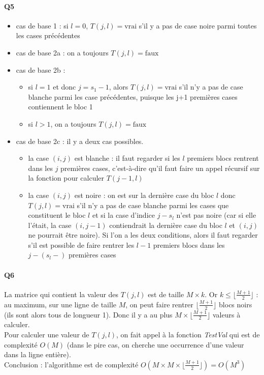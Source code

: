\documentclass[12pt]{article}
\newcommand{\true}{\text{vrai}}
\newcommand{\false}{\text{faux}}
\begin{document}
	\paragraph{Q5}
	
	\begin{itemize}
		\item cas de base 1 : si $ l=0 $, $ T(j,l) = \true $ s'il y a pas de case noire parmi toutes les cases précédentes
		
		\item cas de base 2a : on a toujours $ T(j,l) = \false $
		
		\item cas de base 2b : \begin{itemize}
			\item si $ l=1 $ et donc $ j = s_1-1$, alors $ T(j,l) = \true $ s'il n'y a pas de case blanche parmi les case précédentes, puisque les j+1 premières cases contiennent le bloc 1
			\item si $ l > 1 $, on a toujours $ T(j,l) = \false $
		\end{itemize} 
		
		\item cas de base 2c : il y a deux cas possibles.
		\begin{itemize}
			\item la case $ (i,j) $ est blanche : il faut regarder si les $ l $ premiers blocs rentrent dans les $ j $ premières cases, c'est-à-dire qu'il faut faire un appel récursif sur la fonction pour calculer $ T(j-1,l) $
			\item la case $ (i,j) $ est noire : on est sur la dernière case du bloc $ l $ donc $ T(j,l) = \true $ s'il n'y a pas de case blanche parmi les cases que constituent le bloc $ l $ et si la case d'indice $ j-s_l $ n'est pas noire (car si elle l'était, la case $ (i,j-1) $ contiendrait la dernière case du bloc $ l $ et $ (i,j) $ ne pourrait être noire). Si l'on a les deux conditions, alors il faut regarder s'il est possible de faire rentrer les $ l-1 $ premiers blocs dans les $ j-(s_l-) $ premières cases
		\end{itemize}
	\end{itemize}
	
	\paragraph{Q6}
	
	La matrice qui contient la valeur des $ T(j,l) $ est de taille $ M \times k $. Or $ k \leq \lfloor \frac{M+1}{2} \rfloor $ : au maximum, sur une ligne de taille $ M $, on peut faire rentrer $ \lfloor \frac{M+1}{2} \rfloor $ blocs noirs (ils sont alors tous de longueur 1). Donc il y a au plus $ M \times \lfloor \frac{M+1}{2} \rfloor $ valeurs à calculer. \\
	Pour calculer une valeur de $ T(j,l) $, on fait appel à la fonction \textit{TestVal} qui est de complexité $ O(M) $ (dans le pire cas, on cherche une occurrence d'une valeur dans la ligne entière). \\
	Conclusion : l'algorithme est de complexité $ O(M \times M \times \lfloor \frac{M+1}{2} \rfloor) = \boxed{O(M^3)} $
	
\end{document}

